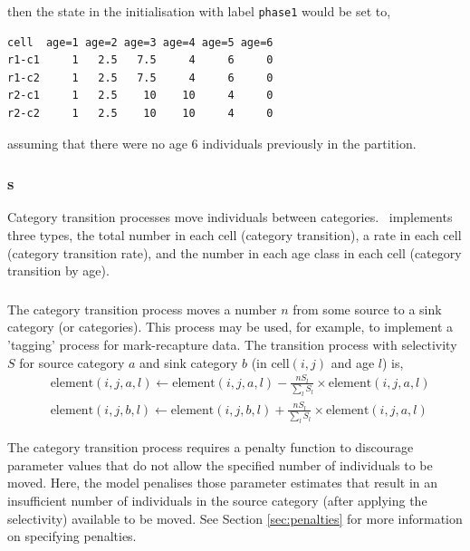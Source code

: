 then the state in the initialisation with label \texttt{phase1} would be set to,
{\small{\begin{verbatim}
cell  age=1 age=2 age=3 age=4 age=5 age=6
r1-c1     1   2.5   7.5     4     6     0
r1-c2     1   2.5   7.5     4     6     0
r2-c1     1   2.5    10    10     4     0
r2-c2     1   2.5    10    10     4     0 
\end{verbatim}}}

assuming that there were no age $6$ individuals previously in the partition. 

\subsubsection{s}

Category transition processes move individuals between categories. \SPM\ implements three types, the total number in each cell (category transition), a rate in each cell (category transition rate), and the number in each age class in each cell (category transition by age).

\subsubsection*{}

The category transition process moves a number $n$ from some source to a sink category (or categories). This process may be used, for example, to implement a 'tagging' process for mark-recapture data. The transition process with selectivity $S$ for source category $a$ and sink category $b$ (in cell$(i,j)$ and age $l$) is,
\begin{equation}\begin{split}
  & \text{element}(i,j,a,l) \leftarrow \text{element}(i,j,a,l) - \frac{nS_l}{\sum\limits_l S_l} \times \text{element}(i,j,a,l) \\
  & \text{element}(i,j,b,l) \leftarrow \text{element}(i,j,b,l) + \frac{nS_l}{\sum\limits_l S_l} \times \text{element}(i,j,a,l)
\end{split}\end{equation}

The category transition process requires a penalty function to discourage parameter values that do not allow the specified number of individuals to be moved. Here, the model penalises those parameter estimates that result in an insufficient number of individuals in the source category (after applying the selectivity) available to be moved. See Section \ref{sec:penalties} for more information on specifying penalties.

